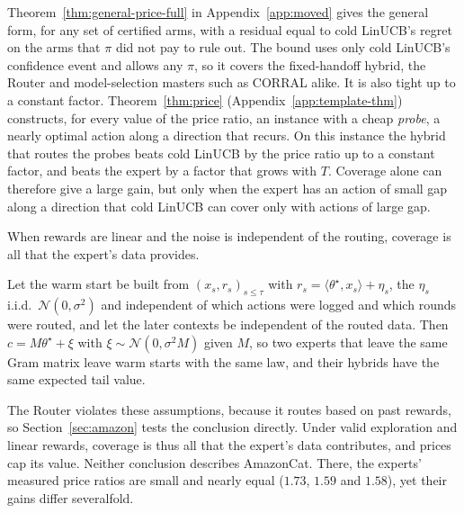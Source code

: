 \documentclass[anon]{alt2027} %
\newif\ifrevmarks\revmarkstrue
\newenvironment{revised}{\ifrevmarks\color{revcolor}\fi}{}
\begin{document}
\begin{revised}
Theorem~\ref{thm:general-price-full} in Appendix~\ref{app:moved} gives the
general form, for any set of certified arms, with a residual equal to cold
LinUCB's regret on the arms that $\pi$ did not pay to rule out. The bound
uses only cold LinUCB's confidence event and allows any $\pi$, so it covers
the fixed-handoff hybrid, the Router and model-selection masters such as
CORRAL alike. It is also tight up to a constant factor.
Theorem~\ref{thm:price} (Appendix~\ref{app:template-thm}) constructs, for
every value of the price ratio, an instance with a cheap \emph{probe}, a
nearly optimal action along a direction that recurs. On this instance the
hybrid that routes the probes beats cold LinUCB by the price ratio up to a
constant factor, and beats the expert by a factor that grows with $T$.
Coverage alone can therefore give a large gain, but only when the expert has
an action of small gap along a direction that cold LinUCB can cover only
with actions of large gap.
\end{revised}

\begin{revised}
When rewards are linear and the noise is independent of the routing,
coverage is all that the expert's data provides.
\end{revised}

\begin{observation}
\label{prop:response-sum}
\label{cor:coverage-complete}
Let the warm start be built from $(x_s,r_s)_{s\le\tau}$ with
$r_s=\langle\theta^\star,x_s\rangle+\eta_s$, the $\eta_s$ i.i.d.\
$\mathcal N(0,\sigma^2)$ and independent of which actions were logged and
which rounds were routed, and let the later contexts be independent of the
routed data. Then $c=M\theta^\star+\xi$ with $\xi\sim\mathcal N(0,\sigma^2M)$
given $M$, so two experts that leave the same Gram matrix leave warm starts
with the same law, and their hybrids have the same expected tail value.
\end{observation}

\begin{revised}
The Router violates these assumptions, because it routes based on past
rewards, so Section~\ref{sec:amazon} tests the conclusion directly. Under
valid exploration and linear rewards, coverage is thus all that the
expert's data contributes, and prices cap its value. Neither conclusion
describes AmazonCat. There, the experts' measured price ratios are small and
nearly equal ($1.73$, $1.59$ and $1.58$), yet their gains differ
severalfold.
\end{revised}
\end{document}
